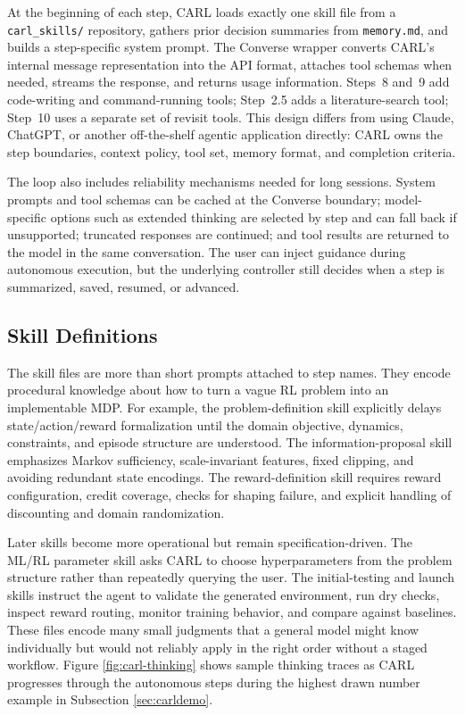 \documentclass[mnsc,sglanonrev]{informs4}
\begin{document}
At the beginning of each step, CARL loads exactly one skill file from a \texttt{carl\_skills/} repository, gathers prior decision summaries from \texttt{memory.md}, and builds a step-specific system prompt. The Converse wrapper converts CARL's internal message representation into the API format, attaches tool schemas when needed, streams the response, and returns usage information. Steps~8 and~9 add code-writing and command-running tools; Step~2.5 adds a literature-search tool; Step~10 uses a separate set of revisit tools. This design differs from using Claude, ChatGPT, or another off-the-shelf agentic application directly: CARL owns the step boundaries, context policy, tool set, memory format, and completion criteria.

The loop also includes reliability mechanisms needed for long sessions. System prompts and tool schemas can be cached at the Converse boundary; model-specific options such as extended thinking are selected by step and can fall back if unsupported; truncated responses are continued; and tool results are returned to the model in the same conversation. The user can inject guidance during autonomous execution, but the underlying controller still decides when a step is summarized, saved, resumed, or advanced.

\subsection{Skill Definitions}

The skill files are more than short prompts attached to step names. They encode procedural knowledge about how to turn a vague RL problem into an implementable MDP. For example, the problem-definition skill explicitly delays state/action/reward formalization until the domain objective, dynamics, constraints, and episode structure are understood. The information-proposal skill emphasizes Markov sufficiency, scale-invariant features, fixed clipping, and avoiding redundant state encodings. The reward-definition skill requires reward configuration, credit coverage, checks for shaping failure, and explicit handling of discounting and domain randomization.

Later skills become more operational but remain specification-driven. The ML/RL parameter skill asks CARL to choose hyperparameters from the problem structure rather than repeatedly querying the user. The initial-testing and launch skills instruct the agent to validate the generated environment, run dry checks, inspect reward routing, monitor training behavior, and compare against baselines. These files encode many small judgments that a general model might know individually but would not reliably apply in the right order without a staged workflow. Figure \ref{fig:carl-thinking} shows sample thinking traces as CARL progresses through the autonomous steps during the highest drawn number example in Subsection \ref{sec:carldemo}.
\end{document}
